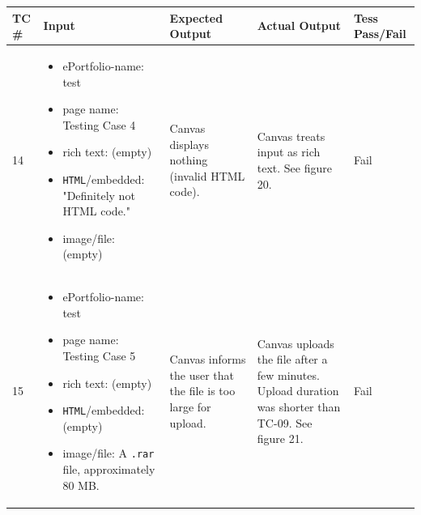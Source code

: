 \documentclass[10pt,letterpaper]{article}
\begin{document}
\begin{table}[h!]
\begin{tabularx}{\textwidth}{lXXXl}
\toprule
TC \# &
  Input &
  Expected Output &
  Actual Output &
  Tess Pass/Fail \\ \midrule
14 &
  \begin{itemize}
    \item{ePortfolio-name: test}
    \item{page name: Testing Case 4}
    \item{rich text: (empty)}
    \item{\texttt{HTML}/embedded: "Definitely not HTML code."}
    \item{image/file: (empty)}
  \end{itemize} &
   Canvas displays nothing (invalid HTML code). &
   Canvas treats input as rich text. See figure 20. &
   Fail \\ \midrule
15 &
  \begin{itemize}
    \item{ePortfolio-name: test}
    \item{page name: Testing Case 5}
    \item{rich text: (empty)}
    \item{\texttt{HTML}/embedded: (empty)}
    \item{image/file: A \texttt{.rar} file, approximately 80 MB.}
  \end{itemize} &
   Canvas informs the user that the file is too large for upload. &
   Canvas uploads the file after a few minutes. Upload duration was shorter than TC-09. See figure 21. &
   Fail \\ \bottomrule
\end{tabularx}
\end{table}
\end{document}
